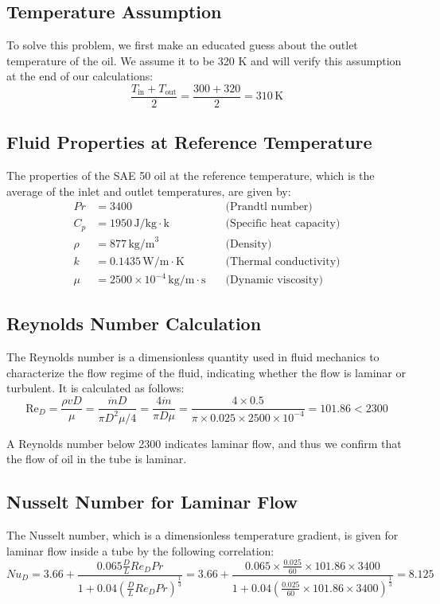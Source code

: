 \documentclass{article}
\numberwithin{equation}{section}
\begin{document}
\subsection*{Temperature Assumption}
To solve this problem, we first make an educated guess about the outlet temperature of the oil. We assume it to be 320 K and will verify this assumption at the end of our calculations:
\begin{equation}
    \frac{T_{\text{in}} + T_{\text{out}}}{2} = \frac{300 + 320}{2} = 310 \, \text{K}
\end{equation}

\subsection*{Fluid Properties at Reference Temperature}
The properties of the SAE 50 oil at the reference temperature, which is the average of the inlet and outlet temperatures, are given by:
\begin{align}
    Pr &= 3400 \quad &\text{(Prandtl number)} \\
    C_{p} &= 1950 \, \text{J/kg} \cdot \text{k} \quad &\text{(Specific heat capacity)} \\
    \rho &= 877 \, \text{kg/m}^3 \quad &\text{(Density)} \\
    k &= 0.1435 \, \text{W/m} \cdot \text{K} \quad &\text{(Thermal conductivity)} \\
    \mu &= 2500 \times 10^{-4} \, \text{kg/m} \cdot \text{s} \quad &\text{(Dynamic viscosity)}
\end{align}

\subsection*{Reynolds Number Calculation}
The Reynolds number is a dimensionless quantity used in fluid mechanics to characterize the flow regime of the fluid, indicating whether the flow is laminar or turbulent. It is calculated as follows:
\begin{equation}
    \text{Re}_{D} = \frac{\rho v D}{\mu} = \frac{\dot{m} D}{\pi D^2 \mu / 4} = \frac{4 \dot{m}}{\pi D \mu} = \frac{4 \times 0.5}{\pi \times 0.025 \times 2500 \times 10^{-4}} = 101.86 < 2300
\end{equation}

A Reynolds number below 2300 indicates laminar flow, and thus we confirm that the flow of oil in the tube is laminar.

\subsection*{Nusselt Number for Laminar Flow}
The Nusselt number, which is a dimensionless temperature gradient, is given for laminar flow inside a tube by the following correlation:
\begin{equation}
    Nu_{D} = 3.66 + \frac{0.065 \frac{D}{L} Re_{D} Pr}{1 + 0.04 \left(\frac{D}{L} Re_{D} Pr\right)^{\frac{1}{3}}} = 3.66 + \frac{0.065 \times \frac{0.025}{60} \times 101.86 \times 3400}{1 + 0.04 \left(\frac{0.025}{60} \times 101.86 \times 3400\right)^{\frac{1}{3}}} = 8.125
\end{equation}
\end{document}
